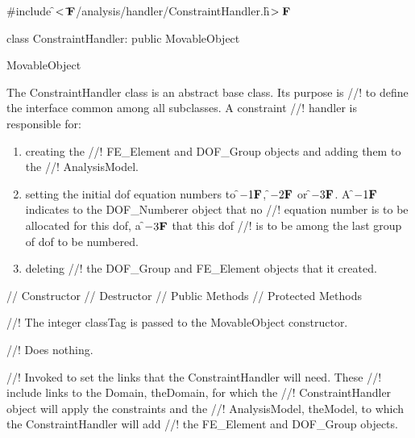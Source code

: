 
\indent \#include \f$<\tilde{ }{\bf F}$/analysis/handler/ConstraintHandler.h\f$>{\bf F}$

\indent class ConstraintHandler: public MovableObject

\indent MovableObject
\indent{}

\indent The ConstraintHandler class is an abstract base class. Its purpose is
//! to define the interface common among all subclasses.  A constraint
//! handler is responsible for: \begin{enumerate} \item creating the
//! FE\_Element and DOF\_Group objects and adding them to the
//! AnalysisModel. \item setting the initial dof equation numbers to \f$-1{\bf F}$,
\f$-2{\bf F}$ or \f$-3{\bf F}$. A \f$-1{\bf F}$ indicates to the DOF\_Numberer object that no
//! equation number is to be allocated for this dof, a \f$-3{\bf F}$ that this dof
//! is to be among the last group of dof to be numbered. \item deleting
//! the DOF\_Group and FE\_Element objects that it created.\end{enumerate}


\indent // Constructor
\indent // Destructor
\indent // Public Methods
\indent // Protected Methods


//! The integer \p classTag is passed to the MovableObject constructor.

//! Does nothing.

//! Invoked to set the links that the ConstraintHandler will need. These
//! include links to the Domain, \p theDomain, for which the
//! ConstraintHandler object will apply the constraints and the
//! AnalysisModel, \p theModel, to which the ConstraintHandler will add
//! the FE\_Element and DOF\_Group objects.

